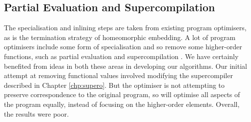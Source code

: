 \subsection{Partial Evaluation and Supercompilation}

The specialisation and inlining steps are taken from existing program optimisers, as is the termination strategy of homeomorphic embedding. A lot of program optimisers include some form of specialisation and so remove some higher-order functions, such as partial evaluation \cite{jones:partial_evaluation} and supercompilation \cite{supercompilation}. We have certainly benefited from ideas in both these areas in developing our algorithms. Our initial attempt at removing functional values involved modifying the supercompiler described in Chapter \ref{chp:supero}. But the optimiser is not attempting to preserve correspondence to the original program, so will optimise all aspects of the program equally, instead of focusing on the higher-order elements. Overall, the results were poor.

